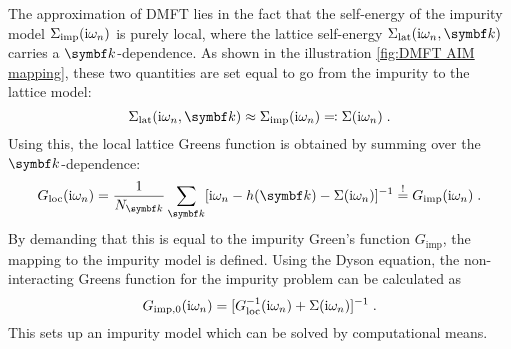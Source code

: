 \documentclass[../main.tex]{subfiles}
\begin{document}
The approximation of DMFT lies in the fact that the self-energy of the impurity model \(\Sigma_{\mathrm{imp}} (\mathrm{i} \omega_n)\) is purely local, where the lattice self-energy \(\Sigma_{\mathrm{lat}} (\iu \omega_n, \vb{k})\) carries a \(\vb{k}\)-dependence.
As shown in the illustration \cref{fig:DMFT AIM mapping}, these two quantities are set equal to go from the impurity to the lattice model:
\begin{equation}
	\Sigma_{\mathrm{lat}} (\iu \omega_n, \vb{k}) \approx \Sigma_{\mathrm{imp}} (\iu \omega_n) \eqcolon \Sigma (\iu \omega_n) \;.
\end{equation}
Using this, the local lattice Greens function is obtained by summing over the \(\vb{k}\)-dependence:
\begin{equation}
	G_{\mathrm{loc}} (\iu \omega_n) = \frac{1}{N_{\vb{k}}} \sum_{\vb{k}} [\iu \omega_n - h(\vb{k}) - \Sigma (\iu \omega_n)]^{-1} \overset{!}{=} G_{\mathrm{imp}} (\iu \omega_n) \;.
	\label{eq:local_lattice_Greens_function}
\end{equation}
By demanding that this is equal to the impurity Green's function \(G_{\mathrm{imp}}\), the mapping to the impurity model is defined.
Using the Dyson equation, the non-interacting Greens function for the impurity problem can be calculated as
\begin{equation}
	G_{\mathrm{imp}, 0} (\mathrm{i} \omega_n) = [G_{\mathrm{loc}}^{-1} (\mathrm{i} \omega_n) + \Sigma (\mathrm{i} \omega_n)]^{-1} \;.
	\label{eq:non-interacting_impurity_Greens_function}
\end{equation}
This sets up an impurity model which can be solved by computational means.
\end{document}
